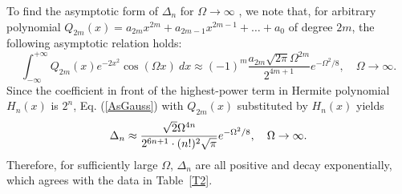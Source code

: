 \documentclass[aps,preprint,showkeys,
]{revtex4}
\begin{document}
To find the asymptotic form of $\Delta _{n}$ for $\Omega \rightarrow \infty $%
, we note that, for arbitrary polynomial $%
Q_{2m}(x)=a_{2m}x^{2m}+a_{2m-1}x^{2m-1}+\ldots +a_{0}$ of degree $2m$, the
following asymptotic relation holds:
\begin{equation}
\int_{-\infty }^{+\infty }Q_{2m}(x)e^{-2x^{2}}\cos \left( \Omega x\right)
~dx\approx (-1)^{m}\frac{a_{2m}\sqrt{2\pi }\Omega ^{2m}}{2^{4m+1}}e^{-\Omega
^{2}/8},\quad \Omega \rightarrow \infty .  \label{AsGauss}
\end{equation}%
Since the coefficient in front of the highest-power term in Hermite
polynomial $H_{n}(x)$ is $2^{n}$, Eq. (\ref{AsGauss}) with $Q_{2m}(x)$
substituted by $H_{n}(x)$ yields
\begin{equation}
\Delta _{n}\approx \frac{\sqrt{2}\Omega ^{4n}}{2^{6n+1}\cdot (n!)^{2}\sqrt{%
\pi }}e^{-\Omega ^{2}/8},\quad \Omega \rightarrow \infty .
\end{equation}%
Therefore, for sufficiently large $\Omega $, $\Delta _{n}$ {are all positive}
and decay exponentially, which agrees with the data in Table~\ref{T2}.
\end{document}

